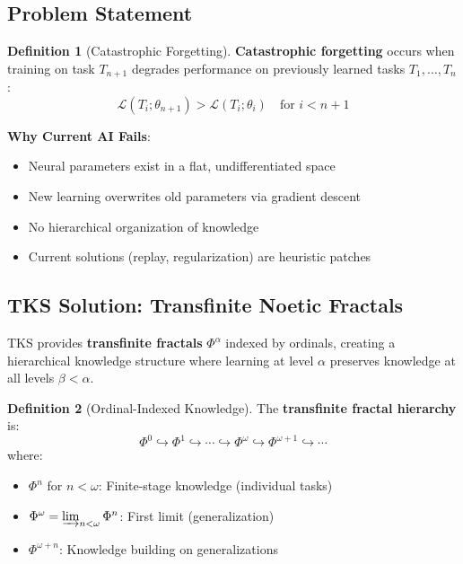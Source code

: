 \documentclass[11pt,twoside]{article}
\theoremstyle{definition}
\newtheorem{definition}{Definition}[section]
\theoremstyle{plain}
\theoremstyle{remark}
\newcommand{\TransFrac}[1]{\Phi^{#1}}
\begin{document}
\subsection{Problem Statement}

\begin{definition}[Catastrophic Forgetting]
\label{def:catastrophic-forgetting}
\textbf{Catastrophic forgetting} occurs when training on task $T_{n+1}$ degrades
performance on previously learned tasks $T_1, \ldots, T_n$:
\[
\mathcal{L}(T_i; \theta_{n+1}) > \mathcal{L}(T_i; \theta_i) \quad \text{for } i < n+1
\]
\end{definition}

\textbf{Why Current AI Fails}:
\begin{itemize}
  \item Neural parameters exist in a flat, undifferentiated space
  \item New learning overwrites old parameters via gradient descent
  \item No hierarchical organization of knowledge
  \item Current solutions (replay, regularization) are heuristic patches
\end{itemize}

\subsection{TKS Solution: Transfinite Noetic Fractals}

TKS provides \textbf{transfinite fractals} $\TransFrac{\alpha}$ indexed by ordinals,
creating a hierarchical knowledge structure where learning at level $\alpha$ preserves
knowledge at all levels $\beta < \alpha$.

\begin{definition}[Ordinal-Indexed Knowledge]
\label{def:ordinal-knowledge}
The \textbf{transfinite fractal hierarchy} is:
\[
\TransFrac{0} \hookrightarrow \TransFrac{1} \hookrightarrow \cdots \hookrightarrow
\TransFrac{\omega} \hookrightarrow \TransFrac{\omega+1} \hookrightarrow \cdots
\]
where:
\begin{itemize}
  \item $\TransFrac{n}$ for $n < \omega$: Finite-stage knowledge (individual tasks)
  \item $\TransFrac{\omega} = \varinjlim_{n < \omega} \TransFrac{n}$: First limit (generalization)
  \item $\TransFrac{\omega+n}$: Knowledge building on generalizations
\end{itemize}
\end{definition}
\end{document}
